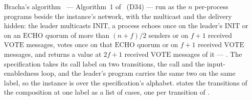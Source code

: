 \begin{definition}
  \label{def:aba-bracha-implementation}
  \leanok
  Bracha's algorithm~\cite{Bra87} --- Algorithm~1 of~\cite{AFW25} (D34) --- run as the $n$ per-process programs beside the instance's network, with the multicast and the delivery hidden: the leader multicasts $\mathrm{INIT}$, a process echoes once on the leader's $\mathrm{INIT}$ or on an $\mathrm{ECHO}$ quorum of more than $(n+f)/2$ senders or on $f{+}1$ received $\mathrm{VOTE}$ messages, votes once on that $\mathrm{ECHO}$ quorum or on $f{+}1$ received $\mathrm{VOTE}$ messages, and returns a value at $2f{+}1$ received $\mathrm{VOTE}$ messages of it --- .
  The specification takes its call label on two transitions, the call and the input-enabledness loop, and the leader's program carries the same two on the same label, so the instance is over the specification's alphabet.
   states the transitions of the composition at one label as a list of cases, one per transition of .
\end{definition}
